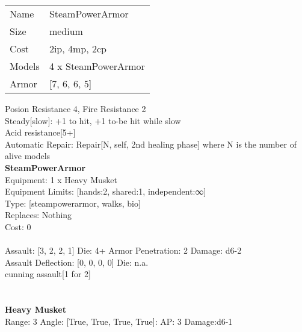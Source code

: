 \begin{tabular}{ll}
  Name & SteamPowerArmor \\
  Size & medium\\
  Cost & 2ip, 4mp, 2cp\\
  Models & 4 x SteamPowerArmor\\
  Armor & [7, 6, 6, 5]\\
\end{tabular}

\noindent Posion Resistance 4, Fire Resistance 2\\ 
Steady[slow]: +1 to hit, +1 to-be hit while slow\\ 
Acid resistance[5+]\\ 
Automatic Repair: Repair[N, self, 2nd healing phase] where N is the number of alive models\\ 


{\bf SteamPowerArmor } \\
Equipment: 1 x Heavy Musket \\
Equipment Limits: [hands:2, shared:1, independent:∞] \\
Type: [steampowerarmor, walks, bio] \\
Replaces: Nothing \\
Cost: 0\\
\ \\
Assault: [3, 2, 2, 1] Die: 4+ Armor Penetration: 2 Damage: d6-2 \\
Assault Deflection: [0, 0, 0, 0] Die: n.a.\\
\indent cunning assault[1 for 2]\\ 
 
\ \\

\ \\
{\bf Heavy Musket } \\



Range: 3  Angle: [True, True, True, True]: AP: 3 Damage:d6-1 \\




 
\ \\



